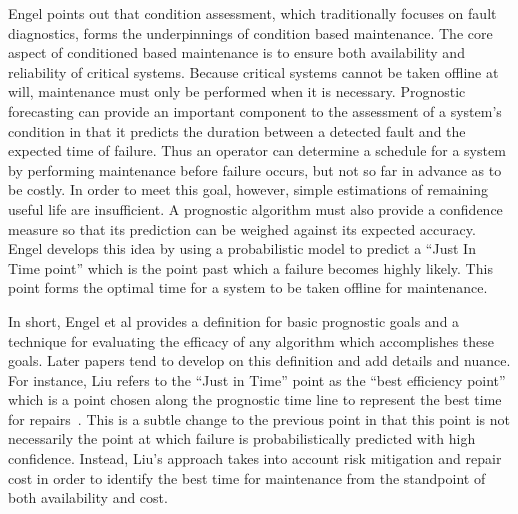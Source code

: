 \documentclass[12pt]{article}
\begin{document}
Engel points out that condition assessment, which traditionally
focuses on fault diagnostics, forms the underpinnings of condition
based maintenance.  The core aspect of conditioned based maintenance
is to ensure both availability and reliability of critical systems.
Because critical systems cannot be taken offline at will, maintenance
must only be performed when it is necessary.  Prognostic forecasting
can provide an important component to the assessment of a system's
condition in that it predicts the duration between a detected fault
and the expected time of failure.  Thus an operator can determine a
schedule for a system by performing maintenance before failure occurs,
but not so far in advance as to be costly.  In order to meet this
goal, however, simple estimations of remaining useful life are
insufficient.  A prognostic algorithm must also provide a confidence
measure so that its prediction can be weighed against its expected
accuracy.  Engel develops this idea by using a probabilistic model to
predict a ``Just In Time point'' which is the point past which a
failure becomes highly likely.  This point forms the optimal time for
a system to be taken offline for maintenance.

In short, Engel et al provides a definition for basic prognostic goals
and a technique for evaluating the efficacy of any algorithm which
accomplishes these goals.  Later papers tend to develop on this
definition and add details and nuance.  For instance, Liu refers to
the ``Just in Time'' point as the ``best efficiency point'' which is a
point chosen along the prognostic time line to represent the best time
for repairs~\cite{4585821}.  This is a subtle change to the previous
point in that this point is not necessarily the point at which failure
is probabilistically predicted with high confidence.  Instead, Liu's
approach takes into account risk mitigation and repair cost in order
to identify the best time for maintenance from the standpoint of both
availability and cost.
\end{document}

